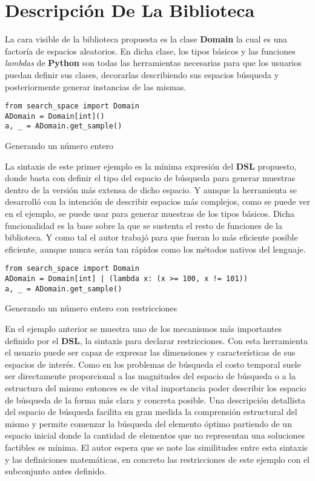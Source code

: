 \section{Descripción De La Biblioteca}

La cara visible de la biblioteca propuesta es la clase {\bf Domain} la cual es una factoría de espacios
aleatorios. En dicha clase, los tipos básicos y las funciones {\it lambdas} de {\bf Python} son todas
las herramientas necesarias para que los usuarios puedan definir sus clases, decorarlas describiendo
sus espacios búsqueda y posteriormente generar instancias de las mismas.


\begin{listing}[!ht]
    \begin{verbatim}
from search_space import Domain
ADomain = Domain[int]()
a, _ = ADomain.get_sample()
    \end{verbatim}
    \caption{Generando un número entero}
    \label{lst:example}
\end{listing}

La sintaxis de este primer ejemplo es la mínima expresión del {\bf DSL} propuesto, donde basta con
definir el tipo del espacio de búsqueda para generar muestras dentro de la versión más extensa de dicho
espacio. Y aunque la herramienta se desarrolló con la intención de describir espacios más complejos,
como se puede ver en el ejemplo, se puede usar para generar muestras de los tipos básicos. Dicha
funcionalidad es la base sobre la que se sustenta el resto de funciones de la biblioteca.
Y como tal el autor trabajó para que fueran lo más eficiente posible eficiente, aunque nunca serán
tan rápidos como los métodos nativos del lenguaje.

\begin{listing}[!ht]
    \begin{verbatim}
from search_space import Domain
ADomain = Domain[int] | (lambda x: (x >= 100, x != 101))
a, _ = ADomain.get_sample()
    \end{verbatim}
    \caption{Generando un número entero con restricciones}
    \label{ex:func}
\end{listing}


En el ejemplo anterior se muestra uno de los mecanismos más importantes definido por el
    {\bf DSL}, la sintaxis para declarar restricciones. Con esta herramienta el usuario puede ser capaz de
expresar las dimensiones y características de sus espacios de interés. Como en los problemas de búsqueda el
costo temporal suele ser directamente proporcional a las magnitudes del espacio de búsqueda o a la estructura
del mismo entonces es de vital importancia poder describir los espacio de búsqueda de la forma más clara y
concreta posible. Una descripción detallista del espacio de búsqueda facilita en gran medida la comprensión
estructural del mismo y permite comenzar la búsqueda del elemento óptimo partiendo de un espacio inicial donde
la cantidad de elementos que no representan una soluciones factibles es mínima. El autor espera que se note las
similitudes entre esta sintaxis y las definiciones matemáticas, en concreto las restricciones de este ejemplo
con el subconjunto antes definido.


